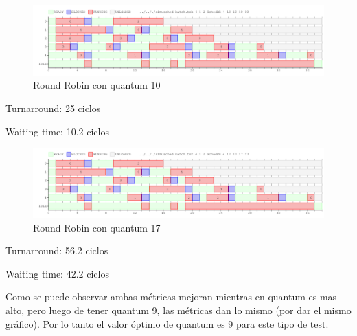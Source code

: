 \begin{figure}[H]
\begin{center}
\includegraphics[width=1.1\textwidth]{img/core4q10.png}
     \caption{Round Robin con quantum 10}
\end{center}
\end{figure}

Turnarround: 25 ciclos

Waiting time: 10.2 ciclos 

\begin{figure}[H]
\begin{center}
\includegraphics[width=1.1\textwidth]{img/core4q17.png}
     \caption{Round Robin con quantum 17}
\end{center}
\end{figure}

Turnarround: 56.2 ciclos

Waiting time: 42.2 ciclos

Como se puede observar ambas métricas mejoran mientras en quantum es mas alto, pero luego de tener quantum 9, las métricas dan lo mismo (por dar el mismo gráfico). Por lo tanto el valor óptimo de quantum es 9 para este tipo de test.